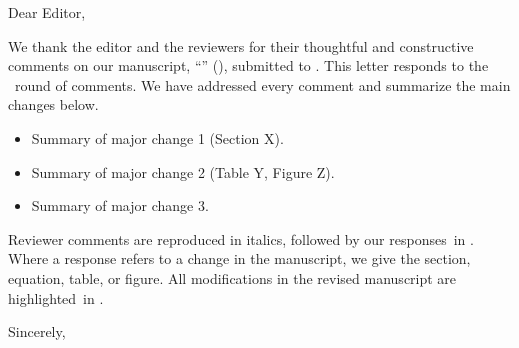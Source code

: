 \newcommand{\reviewer}{%
  \stepcounter{reviewer}%
  \edef\CommentPrefix{R\arabic{reviewer}}\setcounter{revcomment}{0}%
  \responseheading{Comments from Reviewer \#\arabic{reviewer}}}

\newcommand{\reviewercomment}[1]{%
  \refstepcounter{revcomment}%
  \par\medskip\noindent\textbf{Comment \therevcomment.}\ \textit{#1}\par}

\newenvironment{response}
  {\par\noindent\ifcolorresponses\color{\ResponseColor}\fi\textbf{Response.}\ }
  {\par}

\newenvironment{revisedtext}[1][]
  {\par\smallskip\noindent\textit{Revised text}\if\relax\detokenize{#1}\relax\else\ (#1)\fi:%
   \begin{quote}\small}
  {\end{quote}}

\signature{Author One, Author Two, and Author Three}


\begin{letter}{}
  \opening{Dear Editor,}

  We thank the editor and the reviewers for their thoughtful and constructive comments on our manuscript, ``\ManuscriptTitle'' (\ManuscriptID), submitted to \textit{\JournalName}. This letter responds to the \RevisionRound\ round of comments. We have addressed every comment and summarize the main changes below.

  \begin{itemize}
    \item Summary of major change 1 (Section X).
    \item Summary of major change 2 (Table Y, Figure Z).
    \item Summary of major change 3.
  \end{itemize}

  Reviewer comments are reproduced in italics, followed by our responses\ifcolorresponses\ in {\color{\ResponseColor}\ResponseColor}\fi. Where a response refers to a change in the manuscript, we give the section, equation, table, or figure. All modifications in the revised manuscript are highlighted\ifcolorresponses\ in {\color{\ResponseColor}\ResponseColor}\fi.

  \closing{Sincerely,}
\end{letter}

